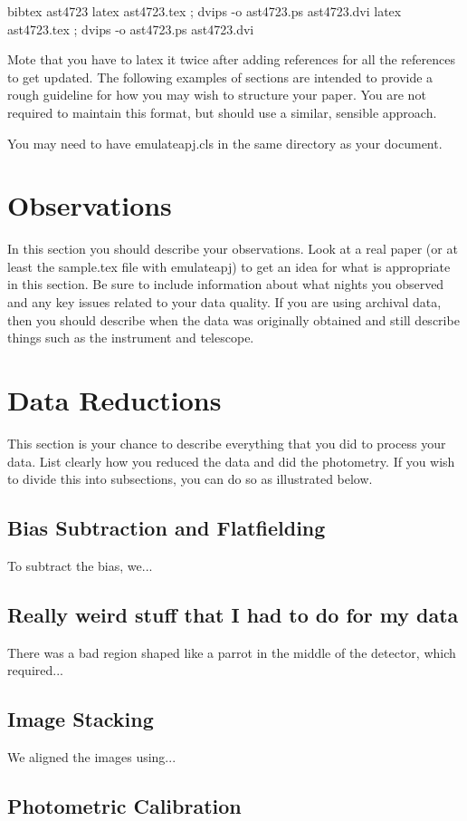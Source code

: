 \documentclass{emulateapj}
\begin{document}
bibtex ast4723
latex ast4723.tex ; dvips -o ast4723.ps ast4723.dvi
latex ast4723.tex ; dvips -o ast4723.ps ast4723.dvi

Mote that you have to latex it twice after adding references for all the references
to get updated.
The following examples of sections are intended to provide a rough guideline for how
you may wish to structure your paper. You are not required to maintain this format,
but should use a similar, sensible approach.

You may need to have emulateapj.cls in the same directory as your document.


\section{Observations}

In this section you should describe your observations. Look at a real paper (or
at least the sample.tex file with emulateapj) to get an idea for what is appropriate
in this section. Be sure to include information about what nights you observed
and any key issues related to your data quality.  If you are using archival data,
then you should describe when the data was originally obtained and still describe 
things such as the instrument and telescope.

\section{Data Reductions}

This section is your chance to describe everything that you did to process your data.
List clearly how you reduced the data and did the photometry. If you wish to divide
this into subsections, you can do so as illustrated below.
\subsection{Bias Subtraction and Flatfielding}
To subtract the bias, we...
\subsection{Really weird stuff that I had to do for my data}
There was a bad region shaped like a parrot in the middle of the detector, which required...
\subsection{Image Stacking}
We aligned the images using...
\subsection{Photometric Calibration}
\end{document}
